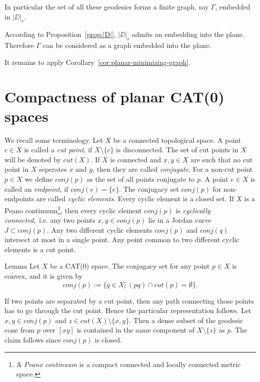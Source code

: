 \documentclass[a4paper,10pt]{amsart}
\begin{document}

In particular the set of all these geodesics forms a finite graph, say $\Gamma$,
embedded in $|\DD|_s$. 

According to Proposition~\ref{prop:|D|},
$|\DD|_s$ admits an embedding into the plane.
Therefore $\Gamma$ can be considered as a graph embedded into the plane.

It remains to apply Corollary~\ref{cor:planar-minimizing-graph}.
\qeds

\section{Compactness of planar CAT(0) spaces}

We recall some terminology. Let $X$ be a connected topological space. A point $c\in X$
is called a {\em cut point}, if $X\setminus \{c\}$ is disconnected. The set of cut points in $X$ 
will be denoted by $cut(X)$. If $X$ is connected and $x,y\in X$ are such that no cut point in $X$
seperates $x$ and $y$, then they are called {\em conjugate}. For a non-cut point $p\in X$
we define $conj(p)$ as the set of all points conjugate to $p$. A point $e\in X$ is called an {\em endpoint},
if $conj(e)=\{e\}$. The conjugacy set $conj(p)$ for non-endpoints
are called {\em cyclic elements}. Every cyclic element is a closed set\cite[IV(1.4)]{W2}. If $X$ is a 
Peano continuum\footnote{A {\em Peano continuum} is a compact
connected and locally connected metric space.}, then every cyclic element $conj(p)$ is {\em cyclically connected},\ i.e.
any two points $x,y\in conj(p)$ lie in a Jordan curve $J\subset conj(p)$\cite[III(3.32)]{Wi}. Any two different 
cyclic elements $conj(p)$ and $conj(q)$ intersect at most in a single point. Any point common to two 
different cyclic elements is a cut point\cite[IV(1.4)]{W2}.

\begin{thm}{Lemma}
 Let $X$ be a CAT(0) space. The conjugacy set for any point $p\in X$ is convex, and it is given by
 $$
conj(p):=\{q\in X|\ (pq)\cap cut(p)=\emptyset \}.
$$
\end{thm}

If two points are separated by a cut point, then any path connecting those points has to go through the cut point.
Hence the particular representation follows. Let $x,y\in conj(p)$ and $z\in cut(X)\setminus\{x,y\}$. Then a dense subset
of the geodesic cone from $p$ over $[xy]$ is contained in the same component of $X\setminus \{z\}$ as $p$. 
The claim follows since $conj(p)$ is closed.
\qeds
\end{document}

